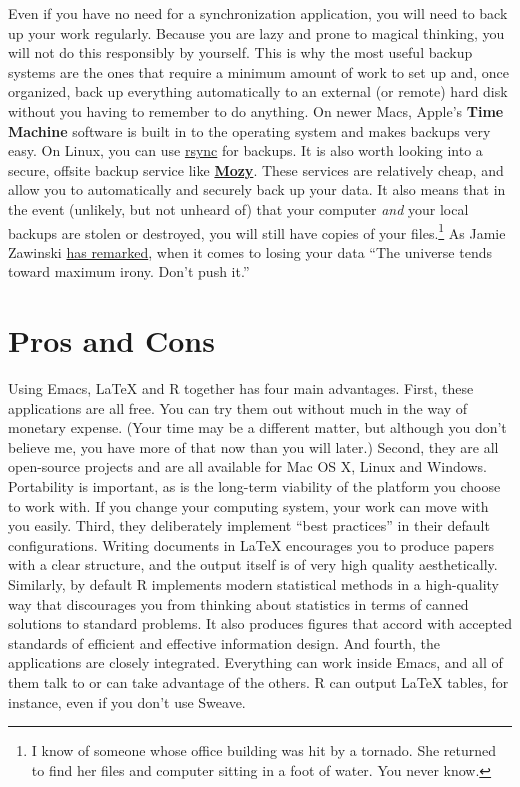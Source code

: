 \documentclass[11pt,article,oneside]{memoir}
\begin{document}
Even if you have no need for a synchronization application, you will need to back up your work regularly. Because you are lazy and prone to magical thinking, you will not do this responsibly by yourself. This is why the most useful backup systems are the ones that require a minimum amount of work to set up and, once organized, back up everything automatically to an external (or remote) hard disk without you having to remember to do anything. On newer Macs, Apple's \textbf{Time Machine} software is built in to the operating system and makes backups very easy. On Linux, you can use \href{http://www.psychocats.net/ubuntu/backup}{rsync} for backups. It is also  worth looking into a secure, offsite backup service like \href{http://mozy.com/}{\textbf{Mozy}}. These services are relatively cheap, and allow you to automatically and securely back up your data. It also means that in the event (unlikely, but not unheard of) that your computer \emph{and} your local backups are stolen or destroyed, you will still have copies of your files.\footnote{I know of someone whose office building was hit by a tornado. She returned to find her files and computer sitting in a foot of water. You never know.} As Jamie Zawinski \href{http://jwz.livejournal.com/801607.html}{has remarked}, when it comes to losing your data ``The universe tends toward maximum irony. Don't push it.''

\section{Pros and Cons}  
Using Emacs, LaTeX and R together has four main advantages. First, these applications are all free. You can try them out without much in the way of monetary expense. (Your time may be a different matter, but although you don't believe me, you have more of that now than you will later.) Second, they are all open-source projects and are all available for Mac OS X, Linux and Windows. Portability is important, as is the long-term viability of the platform you choose to work with. If you change your computing system, your work can move with you easily. Third, they deliberately implement ``best practices'' in their default configurations. Writing documents in LaTeX encourages you to produce papers with a clear structure, and the output itself is of very high quality aesthetically. Similarly, by default R implements modern statistical methods in a high-quality way that discourages you from thinking about statistics in terms of canned solutions to standard problems. It also produces figures that accord with accepted standards of efficient and effective information design. And fourth, the applications are closely integrated. Everything can work inside Emacs, and all of them talk to or can take advantage of the others. R can output LaTeX tables, for instance, even if you don't use Sweave.
\end{document}
